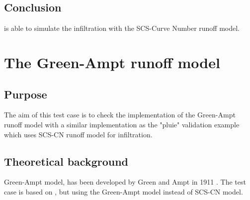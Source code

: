 \subsection{Conclusion}

 is able to simulate the infiltration with the SCS-Curve Number runoff model.

\section{The Green-Ampt runoff model}

\subsection{Purpose}

The aim of this test case is to check the implementation of the Green-Ampt runoff
model with a similar implementation as the "pluie" validation example which uses
SCS-CN runoff model for infiltration.

\subsection{Theoretical background}

Green-Ampt model, has been developed by Green and Ampt in 1911 \cite{GreenAmpt1911}.
The test case is based on \cite{Ligier2016}, but using the Green-Ampt model instead of SCS-CN model.

